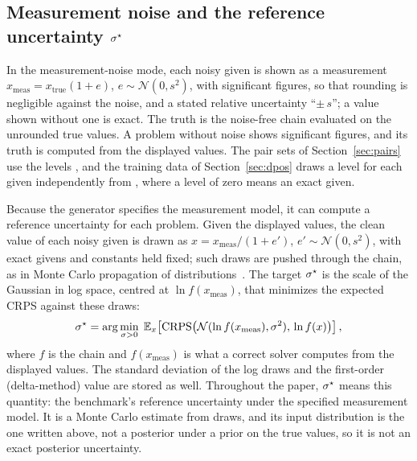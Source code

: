 \subsection{Measurement noise and the reference uncertainty $\sigma^{\star}$}
\label{sec:sigstar}

In the measurement-noise mode, each noisy given is shown as a measurement
$x_{\text{meas}} = x_{\text{true}}(1+e)$, $e \sim \mathcal{N}(0, s^2)$, with  significant
figures, so that rounding is negligible against the noise, and a stated relative uncertainty ``$\pm\, s$''; a value
shown without one is exact.
The truth is the noise-free chain evaluated on the unrounded true values.
A problem without noise shows  significant figures, and its truth is computed from the displayed
values.
The pair sets of Section~\ref{sec:pairs} use the levels , and the training data of
Section~\ref{sec:dpos} draws a level for each given independently from , where a level of zero
means an exact given.

Because the generator specifies the measurement model, it can compute a reference uncertainty for each problem.
Given the displayed values, the clean value of each noisy given is drawn as $x = x_{\text{meas}}/(1+e')$,
$e' \sim \mathcal{N}(0, s^2)$, with exact givens and constants held fixed;  such draws are pushed through
the chain, as in Monte Carlo propagation of distributions~\citep{jcgm101}.
The target $\sigma^{\star}$ is the scale of the Gaussian in log space, centred at $\ln f(x_{\text{meas}})$, that minimizes
the expected CRPS against these draws:
\begin{equation}
  \sigma^{\star} = \arg\min_{\sigma > 0}\; \mathbb{E}_{x}\!\left[\mathrm{CRPS}\!\left(\mathcal{N}(\ln f(x_{\text{meas}}),
  \sigma^2),\, \ln f(x)\right)\right],
  \label{eq:sigstar}
\end{equation}
where $f$ is the chain and $f(x_{\text{meas}})$ is what a correct solver computes from the displayed values.
The standard deviation of the log draws and the first-order (delta-method) value are stored as well.
Throughout the paper, $\sigma^{\star}$ means this quantity: the benchmark's reference uncertainty under the specified
measurement model.
It is a Monte Carlo estimate from  draws, and its input distribution is the one written above, not a
posterior under a prior on the true values, so it is not an exact posterior uncertainty.


